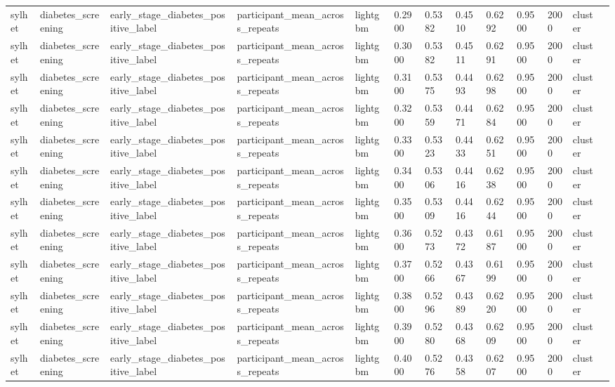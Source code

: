 \begin{tabular}{lllllllllllll}
sylhet & diabetes\_screening & early\_stage\_diabetes\_positive\_label & participant\_mean\_across\_repeats & lightgbm & 0.2900 & 0.5382 & 0.4510 & 0.6292 & 0.9500 & 2000 & cluster &  \\
sylhet & diabetes\_screening & early\_stage\_diabetes\_positive\_label & participant\_mean\_across\_repeats & lightgbm & 0.3000 & 0.5382 & 0.4511 & 0.6291 & 0.9500 & 2000 & cluster &  \\
sylhet & diabetes\_screening & early\_stage\_diabetes\_positive\_label & participant\_mean\_across\_repeats & lightgbm & 0.3100 & 0.5375 & 0.4493 & 0.6298 & 0.9500 & 2000 & cluster &  \\
sylhet & diabetes\_screening & early\_stage\_diabetes\_positive\_label & participant\_mean\_across\_repeats & lightgbm & 0.3200 & 0.5359 & 0.4471 & 0.6284 & 0.9500 & 2000 & cluster &  \\
sylhet & diabetes\_screening & early\_stage\_diabetes\_positive\_label & participant\_mean\_across\_repeats & lightgbm & 0.3300 & 0.5323 & 0.4433 & 0.6251 & 0.9500 & 2000 & cluster &  \\
sylhet & diabetes\_screening & early\_stage\_diabetes\_positive\_label & participant\_mean\_across\_repeats & lightgbm & 0.3400 & 0.5306 & 0.4416 & 0.6238 & 0.9500 & 2000 & cluster &  \\
sylhet & diabetes\_screening & early\_stage\_diabetes\_positive\_label & participant\_mean\_across\_repeats & lightgbm & 0.3500 & 0.5309 & 0.4416 & 0.6244 & 0.9500 & 2000 & cluster &  \\
sylhet & diabetes\_screening & early\_stage\_diabetes\_positive\_label & participant\_mean\_across\_repeats & lightgbm & 0.3600 & 0.5273 & 0.4372 & 0.6187 & 0.9500 & 2000 & cluster &  \\
sylhet & diabetes\_screening & early\_stage\_diabetes\_positive\_label & participant\_mean\_across\_repeats & lightgbm & 0.3700 & 0.5266 & 0.4367 & 0.6199 & 0.9500 & 2000 & cluster &  \\
sylhet & diabetes\_screening & early\_stage\_diabetes\_positive\_label & participant\_mean\_across\_repeats & lightgbm & 0.3800 & 0.5296 & 0.4389 & 0.6220 & 0.9500 & 2000 & cluster &  \\
sylhet & diabetes\_screening & early\_stage\_diabetes\_positive\_label & participant\_mean\_across\_repeats & lightgbm & 0.3900 & 0.5280 & 0.4368 & 0.6209 & 0.9500 & 2000 & cluster &  \\
sylhet & diabetes\_screening & early\_stage\_diabetes\_positive\_label & participant\_mean\_across\_repeats & lightgbm & 0.4000 & 0.5276 & 0.4358 & 0.6207 & 0.9500 & 2000 & cluster &  \\

\end{tabular}
